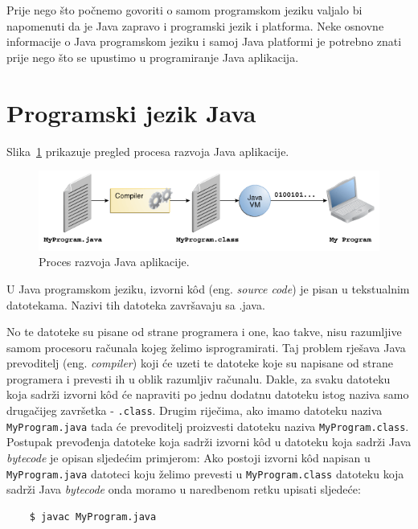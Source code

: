 Prije nego što počnemo govoriti o samom programskom jeziku valjalo bi napomenuti da je Java zapravo i programski jezik i platforma. Neke osnovne informacije o Java programskom jeziku i samoj Java platformi je potrebno znati prije nego što se upustimo u programiranje Java aplikacija.

\section{Programski jezik Java}
Slika~\ref{fig:software-development-process} prikazuje pregled procesa razvoja Java aplikacije.~\cite{javatutorials}

\begin{figure}[h!]
    \label{fig:software-development-process}
    \caption{Proces razvoja Java aplikacije.}
    \centering
    \includegraphics[width=\textwidth]{images/software-development-process}
\end{figure}

U Java programskom jeziku, izvorni kôd (eng. \emph{source code}) je pisan u tekstualnim datotekama. Nazivi tih datoteka završavaju sa .java.

No te datoteke su pisane od strane programera i one, kao takve, nisu razumljive samom procesoru računala kojeg želimo isprogramirati. Taj problem rješava Java prevoditelj (eng. \emph{compiler}) koji će uzeti te datoteke koje su napisane od strane programera i prevesti ih u oblik razumljiv računalu. Dakle, za svaku datoteku koja sadrži izvorni kôd će napraviti po jednu dodatnu datoteku istog naziva samo drugačijeg završetka - \texttt{.class}. Drugim riječima, ako imamo datoteku naziva \texttt{MyProgram.java} tada će prevoditelj proizvesti datoteku naziva \texttt{MyProgram.class}. Postupak prevođenja datoteke koja sadrži izvorni kôd u datoteku koja sadrži Java \emph{bytecode} je opisan sljedećim primjerom: Ako postoji izvorni kôd napisan u \texttt{MyProgram.java} datoteci koju želimo prevesti u \texttt{MyProgram.class} datoteku koja sadrži Java \emph{bytecode} onda moramo u naredbenom retku upisati sljedeće:

\begin{lstlisting}
    $ javac MyProgram.java
\end{lstlisting}


